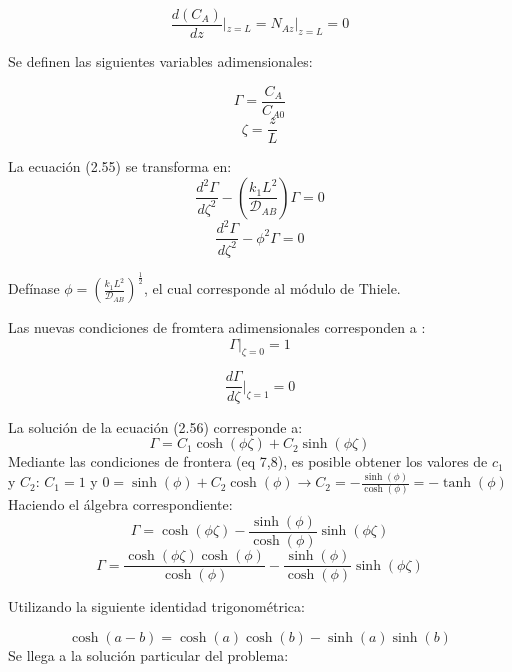 \begin{equation}
    \frac{d(C_A)}{dz}|_{z=L}=N_{Az}|_{z=L}=0
\end{equation}

Se definen las siguientes variables adimensionales:

$$\Gamma=\frac{C_A}{C_{A0}}$$ $$\zeta=\frac{z}{L}$$

La ecuación (2.55) se transforma en:
\begin{equation}
    \frac{d^2\Gamma}{d\zeta^2}-(\frac{k_1L^2}{\mathscr{D}_{AB}})\Gamma=0
\end{equation}
\begin{equation}
  \frac{d^2\Gamma}{d\zeta^2}-\phi^2\Gamma=0  
\end{equation}

Defínase $\phi=(\frac{k_1L^2}{\mathscr{D}_{AB}})^\frac{1}{2}$, el cual corresponde al módulo de Thiele.

Las nuevas condiciones de fromtera adimensionales corresponden a :
\begin{equation}
 \Gamma|_{\zeta=0}=1   
\end{equation}

\begin{equation}
 \frac{d\Gamma}{d\zeta}|_{\zeta=1}=0   
\end{equation}

La solución de la ecuación (2.56) corresponde a:
\begin{equation}
    \Gamma=C_1\cosh({\phi\zeta})+C_2\sinh({\phi\zeta})
\end{equation}
 Mediante las condiciones de frontera (eq {7,8}), es posible obtener los valores de $c_1$ y $C_2$:
 $C_1=1$ y $0=\sinh({\phi})+C_2\cosh(\phi)\longrightarrow C_2=-\frac{\sinh(\phi)}{\cosh({\phi})}=-\tanh({\phi})$
Haciendo el álgebra correspondiente:
\begin{equation*}
 \Gamma=\cosh({\phi\zeta})-\frac{\sinh(\phi)}{\cosh({\phi})}\sinh({\phi\zeta})   
\end{equation*}
\begin{equation*}
 \Gamma=\frac{\cosh({\phi\zeta})\cosh(\phi)}{\cosh(\phi)}-\frac{\sinh({\phi})}{\cosh(\phi)}\sinh({\phi\zeta})   
\end{equation*}

 Utilizando la siguiente identidad trigonométrica: 

 \begin{equation*}
   \cosh({a-b})=\cosh({a})\cosh(b)-\sinh(a) \sinh(b) 
 \end{equation*}
Se llega a la solución particular del problema:


